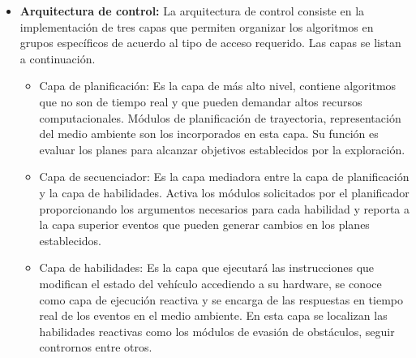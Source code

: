 \begin{itemize}\setlength{\itemsep}{-1mm}
\item \textbf{Arquitectura de control:} La arquitectura de control consiste en la implementación de tres capas que permiten organizar los algoritmos en grupos específicos de acuerdo al tipo de acceso requerido. Las capas se listan a continuación.
  \begin{itemize}\setlength{\itemsep}{-1mm}
  \item Capa de planificación: Es la capa de más alto nivel, contiene algoritmos que no son de tiempo real y que pueden demandar altos recursos computacionales. Módulos de planificación de trayectoria, representación del medio ambiente son los incorporados en esta capa. Su función es evaluar los planes para alcanzar objetivos establecidos por la exploración.
  \item Capa de secuenciador: Es la capa mediadora entre la capa de planificación y la capa de habilidades. Activa los módulos solicitados por el planificador proporcionando los argumentos necesarios para cada habilidad y reporta a la capa superior eventos que pueden generar cambios en los planes establecidos.
  \item Capa de habilidades: Es la capa que ejecutará las instrucciones que modifican el estado del vehículo accediendo a su hardware, se conoce como capa de ejecución reactiva y se encarga de las respuestas en tiempo real de los eventos en el medio ambiente. En esta capa se localizan las habilidades reactivas como los módulos de evasión de obstáculos, seguir contrornos entre otros. 
  \end{itemize}

\end{itemize}

